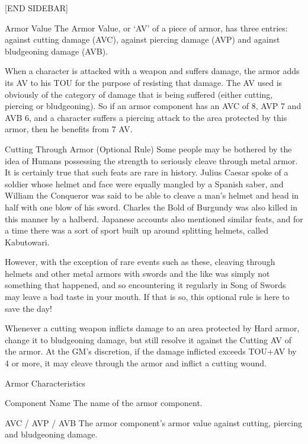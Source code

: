 \documentclass[oneside,11pt,english]{book}
\begin{document}
[END SIDEBAR]

Armor Value
The Armor Value, or ‘AV’ of a piece of armor, has three entries: against cutting damage (AVC), against piercing 
damage (AVP) and against bludgeoning damage (AVB).

When a character is attacked with a weapon and suffers damage, the armor adds its AV to his TOU for the purpose of 
resisting that damage. The AV used is obviously of the category of damage that is being suffered (either cutting, 
piercing or bludgeoning). So if an armor component has an AVC of 8, AVP 7 and AVB 6, and a character suffers a 
piercing attack to the area protected by this armor, then he benefits from 7 AV.

Cutting Through Armor (Optional Rule)
Some people may be bothered by the idea of Humans possessing the strength to seriously cleave through metal armor. 
It is certainly true that such feats are rare in history. Julius Caesar spoke of a soldier whose helmet and face were 
equally mangled by a Spanish saber, and William the Conqueror was said to be able to cleave a man’s helmet and 
head in half with one blow of his sword. Charles the Bold of Burgundy was also killed in this manner by a halberd. 
Japanese accounts also mentioned similar feats, and for a time there was a sort of sport built up around splitting 
helmets, called Kabutowari. 

However, with the exception of rare events such as these, cleaving through helmets and other metal armors with 
swords and the like was simply not something that happened, and so encountering it regularly in Song of Swords may 
leave a bad taste in your mouth. If that is so, this optional rule is here to save the day! 

Whenever a cutting weapon inflicts damage to an area protected by Hard armor, change it to bludgeoning damage, but
still resolve it against the Cutting AV of the armor. At the GM’s discretion, if the damage inflicted exceeds TOU+AV 
by 4 or more, it may cleave through the armor and inflict a cutting wound.


Armor Characteristics

Component Name
The name of the armor component.

AVC / AVP / AVB
The armor component’s armor value against cutting, piercing and bludgeoning damage.
\end{document}

